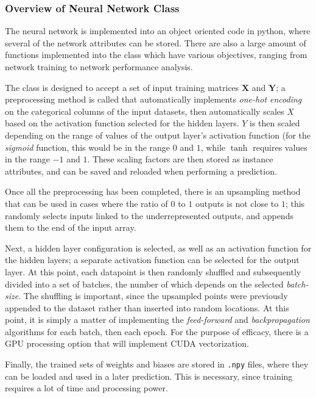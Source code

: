         \subsubsection{Overview of Neural Network Class}
        
The neural network is implemented into an object oriented code in python, where several of the network attributes can be stored. There are also a large amount of functions implemented into the class which have various objectives, ranging from network training to network performance analysis. 
            
            The class is designed to accept a set of input training matrices $\mathbf{X}$ and $\mathbf{Y}$; a preprocessing method is called that automatically implements \textit{one-hot encoding} on the categorical columns of the input datasets, then automatically scales $X$ based on the activation function selected for the hidden layers.  $Y$ is then scaled depending on the range of values of the output layer's activation function (for the \textit{sigmoid} function, this would be in the range $0$ and $1$, while $\tanh$ requires values in the range $-1$ and $1$.  These scaling factors are then stored as instance attributes, and can be saved and reloaded when performing a prediction.
            
            Once all the preprocessing has been completed, there is an upsampling method that can be used in cases where the ratio of $0$ to $1$ outputs is not close to $1$; this randomly selects inputs linked to the underrepresented outputs, and appends them to the end of the input array.
            
            Next, a hidden layer configuration is selected, as well as an activation function for the hidden layers; a separate activation function can be selected for the output layer. At this point, each datapoint is then randomly shuffled and subsequently divided into a set of batches, the number of which depends on the selected \textit{batch-size}.  The shuffling is important, since the upsampled points were previously appended to the dataset rather than inserted into random locations.  At this point, it is simply a matter of implementing the \textit{feed-forward} and \textit{backpropagation} algorithms for each batch, then each epoch.  For the purpose of efficacy, there is a GPU processing option that will implement CUDA vectorization.
            
            Finally, the trained sets of weights and biases are stored in \texttt{.npy} files, where they can be loaded and used in a later prediction.  This is necessary, since training requires a lot of time and processing power.
            
